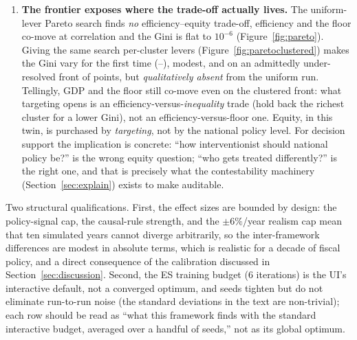 \documentclass[11pt,a4paper]{article}
\begin{document}
\begin{enumerate}
    score multiplies growth by equality, it draws training signal from the whole
    distribution, which is plausibly why it alone pairs the top floor with
    positive growth. Its floor advantage over the utilitarian run is
    \sigEgalUtilFloor{} across \cmpSeeds{} seeds (paired 95\% bootstrap CI). The wellbeing run lands with the utilitarian on GDP
    (\cmpWellGdpDelta\%) but distributes its gains tightly across every province,
    routed through its health/employment/poverty channels rather than GDP alone.
    \item \textbf{The frontier exposes where the trade-off actually lives.}
    The uniform-lever Pareto search finds \emph{no} efficiency--equity
    trade-off, efficiency and the floor co-move at correlation \parCorr{}
    and the Gini is flat to $10^{-6}$ (Figure~\ref{fig:pareto}). Giving the
    same search per-cluster levers (Figure~\ref{fig:paretoclustered}) makes the
    Gini vary for the first time (\parcGiniLo--\parcGiniHi), modest, and on
    an admittedly under-resolved front of \parcPoints{} points, but
    \emph{qualitatively absent} from the uniform run. Tellingly, GDP and the
    floor still co-move even on the clustered front: what targeting opens is an
    efficiency-versus-\emph{inequality} trade (hold back the richest cluster
    for a lower Gini), not an efficiency-versus-floor one. Equity, in this
    twin, is purchased by \emph{targeting}, not by the national policy level.
    For decision support the implication is concrete: ``how interventionist
    should national policy be?'' is the wrong equity question; ``who gets
    treated differently?'' is the right one, and that is precisely what the
    contestability machinery (Section~\ref{sec:explain}) exists to make
    auditable.
\end{enumerate}

Two structural qualifications. First, the effect sizes are bounded by design:
the policy-signal cap, the causal-rule strength, and the $\pm6\%$/year realism
cap mean that ten simulated years cannot diverge arbitrarily, so the
inter-framework differences are modest in absolute terms, which is
realistic for a decade of fiscal policy, and a direct consequence of the
calibration discussed in Section~\ref{sec:discussion}. Second, the ES training
budget (6 iterations) is the UI's interactive default, not a converged
optimum, and \cmpSeeds{} seeds tighten but do not eliminate run-to-run noise
(the standard deviations in the text are non-trivial); each row should be read
as ``what this framework finds with the standard interactive budget, averaged
over a handful of seeds,'' not as its global optimum.
\end{document}
